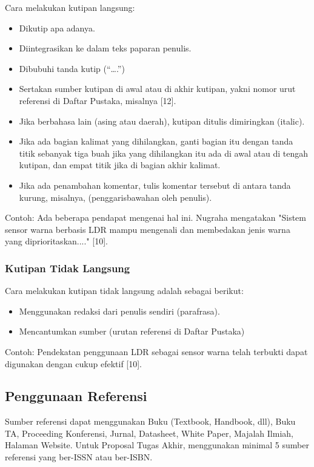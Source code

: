 \documentclass{thesis}
\begin{document}
Cara melakukan kutipan langsung:
\begin{itemize}
    \item Dikutip apa adanya.
    \item Diintegrasikan ke dalam teks paparan penulis.
    \item Dibubuhi tanda kutip (“….”)
    \item Sertakan sumber kutipan di awal atau di akhir kutipan, yakni nomor urut referensi di Daftar Pustaka, misalnya [12].
    \item Jika berbahasa lain (asing atau daerah), kutipan ditulis dimiringkan (italic).
    \item Jika ada bagian kalimat yang dihilangkan, ganti bagian itu dengan tanda titik sebanyak tiga buah jika yang dihilangkan itu ada di awal atau di tengah kutipan, dan empat titik jika di bagian akhir kalimat.
    \item Jika ada penambahan komentar, tulis komentar tersebut di antara tanda kurung, misalnya, (penggarisbawahan oleh penulis).
\end{itemize}

Contoh: Ada beberapa pendapat mengenai hal ini. Nugraha mengatakan "Sistem sensor warna berbasis LDR mampu mengenali dan membedakan jenis warna yang diprioritaskan...." [10].

\subsubsection{Kutipan Tidak Langsung}

Cara melakukan kutipan tidak langsung adalah sebagai berikut:
\begin{itemize}
    \item Menggunakan redaksi dari penulis sendiri (parafrasa).
    \item Mencantumkan sumber (urutan referensi di Daftar Pustaka)
\end{itemize}

Contoh: Pendekatan penggunaan LDR sebagai sensor warna telah terbukti dapat digunakan dengan cukup efektif [10].

\subsection{Penggunaan Referensi}

Sumber referensi dapat menggunakan Buku (Textbook, Handbook, dll), Buku TA, Proceeding Konferensi, Jurnal, Datasheet, White Paper, Majalah Ilmiah, Halaman Website. Untuk Proposal Tugas Akhir, menggunakan minimal 5 sumber referensi yang ber-ISSN atau ber-ISBN.
\end{document}
